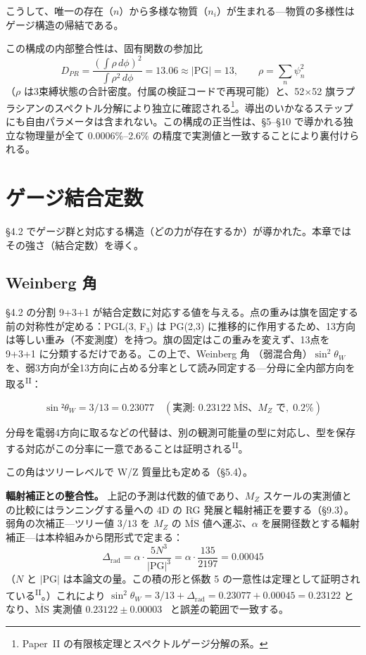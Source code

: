 \documentclass[fontsize=11pt,paper=a4,lualatex]{jlreq}
\newcommand{\PII}{\textsuperscript{\textup{II}}}
\begin{document}
こうして、唯一の存在（$n$）から多様な物質（$n_i$）が生まれる---物質の多様性はゲージ構造の帰結である。

この構成の内部整合性は、固有関数の参加比
\[D_{PR} = \frac{(\int\rho\,d\phi)^2}{\int\rho^2\,d\phi} = 13.06 \approx |\mathrm{PG}| = 13,\qquad \rho = \sum_n \psi_n^2\]
（$\rho$ は3束縛状態の合計密度。付属の検証コードで再現可能）と、52$\times$52 旗ラプラシアンのスペクトル分解により独立に確認される\footnote{Paper~II の有限核定理とスペクトルゲージ分解の系。}。導出のいかなるステップにも自由パラメータは含まれない。この構成の正当性は、§5--§10 で導かれる独立な物理量が全て 0.0006\%--2.6\% の精度で実測値と一致することにより裏付けられる。

\section{ゲージ結合定数}\label{sec:couplings}

§4.2 でゲージ群と対応する構造（どの力が存在するか）が導かれた。本章ではその強さ（結合定数）を導く。

\subsection{Weinberg 角}\label{weinberg-ux89d2}

§4.2 の分割 9+3+1
が結合定数に対応する値を与える。点の重みは旗を固定する前の対称性が定める：PGL(3, F₃) は PG(2,3)
に推移的に作用するため、13方向は等しい重み（不変測度）を持つ。旗の固定はこの重みを変えず、13点を 9+3+1 に分類するだけである。この上で、Weinberg 角 \cite{weinberg}（弱混合角）$\sin^2\!\theta_W$ を、弱3方向が全13方向に占める分率として読み同定する---分母に全内部方向を取る\PII{}：

\[\sin²θ_W = 3/13 = 0.23077 \quad (\text{実測: } 0.23122\;\overline{\mathrm{MS}}\text{、}M_Z\text{ で},\; 0.2\%)\]

分母を電弱4方向に取るなどの代替は、別の観測可能量の型に対応し、型を保存する対応がこの分率に一意であることは証明される\PII{}。

この角はツリーレベルで W/Z 質量比も定める（§5.4）。

\noindent\textbf{輻射補正との整合性。} 上記の予測は代数的値であり、$M_Z$ スケールの実測値との比較にはランニングする量への 4D の RG 発展と輻射補正を要する（§9.3）。弱角の次補正---ツリー値 $3/13$ を $M_Z$ の $\overline{\mathrm{MS}}$ 値へ運ぶ、$\alpha$ を展開径数とする輻射補正---は本枠組みから閉形式で定まる：
\[\Delta_\mathrm{rad} = \alpha\cdot\frac{5N^3}{|\mathrm{PG}|^3} = \alpha\cdot\frac{135}{2197} = 0.00045\]
（$N$ と $|\mathrm{PG}|$ は本論文の量。この積の形と係数 5 の一意性は定理として証明されている\PII{}。）これにより $\sin^2\!\theta_W = 3/13 + \Delta_\mathrm{rad} = 0.23077 + 0.00045 = 0.23122$ となり、$\overline{\mathrm{MS}}$ 実測値 $0.23122 \pm 0.00003$~\cite{pdg} と誤差の範囲で一致する。
\end{document}
